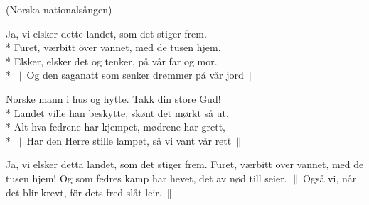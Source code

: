 \begin{SongText}[Ja vi elsker]
    \begin{SongInfo}
        (Norska nationalsången)
    \end{SongInfo}
    \begin{SongVerse}
        Ja, vi elsker dette landet, som det stiger frem.\\*%
        Furet, værbitt över vannet, med de tusen hjem.\\*%
        Elsker, elsker det og tenker, på vår far og mor.\\*%
        $\|\:$Og den saganatt som senker drømmer på vår jord$\:\|$
    \end{SongVerse}
    \begin{SongVerse}
        Norske mann i hus og hytte. Takk din store Gud!\\*%
        Landet ville han beskytte, skønt det mørkt så ut.\\*%
        Alt hva fedrene har kjempet, mødrene har grett,\\*%
        $\|\:$Har den Herre stille lampet, så vi vant vår rett$\:\|$
    \end{SongVerse}
    \begin{SongVerse}
        Ja, vi elsker detta landet, som det stiger frem.
        Furet, værbitt över vannet, med de tusen hjem!
        Og som fedres kamp har hevet, det av nød till seier.
        $\|\:$Også vi, når det blir krevt, för dets fred slåt leir.$\:\|$
    \end{SongVerse}
\end{SongText}